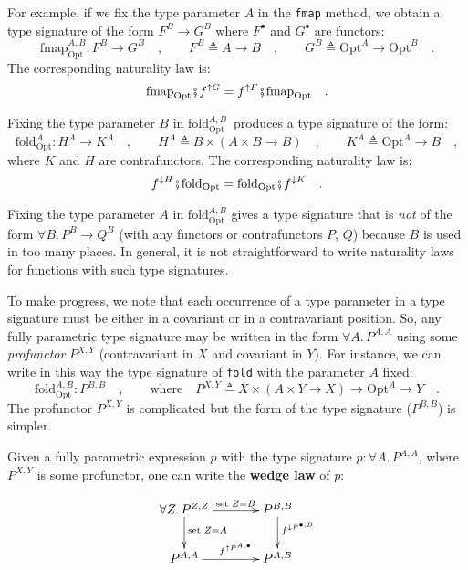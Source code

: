 For example, if we fix the type parameter $A$ in the \lstinline!fmap!
method, we obtain a type signature of the form $F^{B}\rightarrow G^{B}$
where $F^{\bullet}$ and $G^{\bullet}$ are functors:
\[
\text{fmap}_{\text{Opt}}^{A,B}:F^{B}\rightarrow G^{B}\quad,\quad\quad F^{B}\triangleq A\rightarrow B\quad,\quad\quad G^{B}\triangleq\text{Opt}^{A}\rightarrow\text{Opt}^{B}\quad.
\]
The corresponding naturality law is:
\[
\text{fmap}_{\text{Opt}}\bef f^{\uparrow G}=f^{\uparrow F}\bef\text{fmap}_{\text{Opt}}\quad.
\]

Fixing the type parameter $B$ in $\text{fold}_{\text{Opt}}^{A,B}\,$
produces a type signature of the form:
\[
\text{fold}_{\text{Opt}}^{A}:H^{A}\rightarrow K^{A}\quad,\quad\quad H^{A}\triangleq B\times\left(A\times B\rightarrow B\right)\quad,\quad\quad K^{A}\triangleq\text{Opt}^{A}\rightarrow B\quad,
\]
where $K$ and $H$ are contrafunctors. The corresponding naturality
law is:
\[
f^{\downarrow H}\bef\text{fold}_{\text{Opt}}=\text{fold}_{\text{Opt}}\bef f^{\downarrow K}\quad.
\]

Fixing the type parameter $A$ in $\text{fold}_{\text{Opt}}^{A,B}$
gives a type signature that is \emph{not} of the form $\forall B.\,P^{B}\rightarrow Q^{B}$
(with any functors or contrafunctors $P$, $Q$) because $B$ is used
in too many places. In general, it is not straightforward to write
naturality laws for functions with such type signatures. 

To make progress, we note that each occurrence of a type parameter
in a type signature must be either in a covariant or in a contravariant
position. So, any fully parametric type signature may be written in
the form $\forall A.\,P^{A,A}$ using some \emph{profunctor}
$P^{X,Y}$ (contravariant in $X$ and covariant in $Y$). For instance,
we can write in this way the type signature of \lstinline!fold! with
the parameter $A$ fixed:
\[
\text{fold}_{\text{Opt}}^{A,B}:P^{B,B}\quad,\quad\quad\text{where}\quad P^{X,Y}\triangleq X\times(A\times Y\rightarrow X)\rightarrow\text{Opt}^{A}\rightarrow Y\quad.
\]
The profunctor $P^{X,Y}$ is complicated but the form of the type
signature ($P^{B,B}$) is simpler.

Given a fully parametric expression $p$ with the type signature $p:\forall A.\,P^{A,A}$,
where $P^{X,Y}$ is some profunctor, one can write the \textbf{wedge
law}
of $p$:

\begin{wrapfigure}[9]{l}{0.26\columnwidth}%
\vspace{-1.3\baselineskip}
\[
\xymatrix{\xyScaleY{2.0pc}\xyScaleX{3.0pc}\forall Z.\,P^{Z,Z}\ar[d]\sp(0.4){\text{set }Z=A}\ar[r]\sp(0.55){\text{set }Z=B} & P^{B,B}\ar[d]\sp(0.37){f^{\downarrow P^{\bullet,B}}}\\
P^{A,A}\ar[r]\sp(0.55){f^{\uparrow P^{A,\bullet}}} & P^{A,B}
}
\]

\vspace{-0.4\baselineskip}
\end{wrapfigure}%

